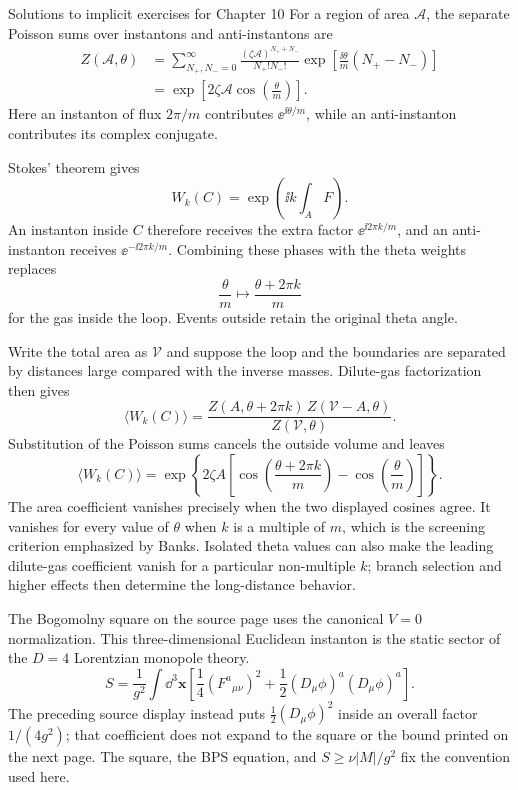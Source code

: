 \begin{bankssolutions}{Solutions to implicit exercises for Chapter 10}
For a region of area $\mathcal A$, the separate Poisson sums over instantons
and anti-instantons are
\[
\begin{aligned}
  Z(\mathcal A,\theta)
  &=\sum_{N_+,N_-=0}^{\infty}
  \frac{(\zeta\mathcal A)^{N_++N_-}}{N_+!N_-!}
  \exp\left[\frac{\ii\theta}{m}(N_+-N_-)\right]\\
  &=\exp\left[2\zeta\mathcal A\cos\left(\frac{\theta}{m}\right)\right].
\end{aligned}
\]
Here an instanton of flux $2\pi/m$ contributes $\ee^{\ii\theta/m}$, while an
anti-instanton contributes its complex conjugate.

Stokes' theorem gives
\[
  W_k(C)=\exp\left(\ii k\int_A F\right).
\]
An instanton inside $C$ therefore receives the extra factor
$\ee^{\ii2\pi k/m}$, and an anti-instanton receives
$\ee^{-\ii2\pi k/m}$.  Combining these phases with the theta weights replaces
\[
  \frac{\theta}{m}\longmapsto\frac{\theta+2\pi k}{m}
\]
for the gas inside the loop.  Events outside retain the original theta angle.

Write the total area as $\mathcal V$ and suppose the loop and the boundaries
are separated by distances large compared with the inverse masses.  Dilute-gas
factorization then gives
\[
  \langle W_k(C)\rangle
  =\frac{Z(A,\theta+2\pi k)\,
  Z(\mathcal V-A,\theta)}{Z(\mathcal V,\theta)}.
\]
Substitution of the Poisson sums cancels the outside volume and leaves
\[
  \langle W_k(C)\rangle=
  \exp\left\{2\zeta A\left[
  \cos\left(\frac{\theta+2\pi k}{m}\right)
  -\cos\left(\frac{\theta}{m}\right)\right]\right\}.
\]
The area coefficient vanishes precisely when the two displayed cosines agree.
It vanishes for every value of $\theta$ when $k$ is a multiple of $m$, which
is the screening criterion emphasized by Banks.  Isolated theta values can
also make the leading dilute-gas coefficient vanish for a particular
non-multiple $k$; branch selection and higher effects then determine the
long-distance behavior.

The Bogomolny square on the source page uses the canonical $V=0$
normalization.  This three-dimensional Euclidean instanton is the static
sector of the $D=4$ Lorentzian monopole theory.
\[
  S=\frac1{g^2}\int\dd^3\mathbf x\left[
    \frac14(F^a{}_{\mu\nu})^2+
    \frac12(D_\mu\phi)^a(D_\mu\phi)^a\right].
\]
The preceding source display instead puts
$\tfrac12(D_\mu\phi)^2$ inside an overall factor $1/(4g^2)$; that coefficient
does not expand to the square or the bound printed on the next page.  The
square, the BPS equation, and $S\ge\nu|M|/g^2$ fix the convention used here.


\end{bankssolutions}
